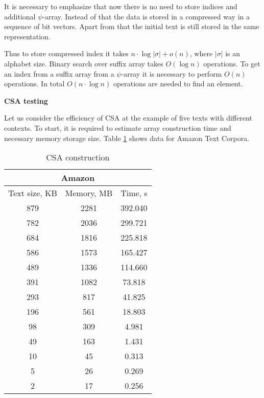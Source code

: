 It is necessary to emphasize that now there is no need to store indices and additional $\psi$-array.
Instead of that the data is stored in a compressed way in a sequence of bit vectors.
Apart from that the initial text is still stored in the same representation.

Thus to store compressed index it takes $n \cdot \log |\sigma| + o(n)$, where
$|\sigma|$ is an alphabet size. Binary search over suffix array takes $O(\log n)$ operations.
To get an index from a suffix array from a $\psi$-array it is necessary to perform $O(n)$ operations.
In total $O(n\cdot \log n)$ operations are needed to find an element.

\textbf{CSA testing}

Let us consider the efficiency of CSA at the example of five texts with different contexts.
To start, it is required to estimate array construction time and necessary memory storage size.
Table \ref{table:6} shows data for Amazon Text Corpora.


\begin{table}[ht!]
	\centering
	\begin{tabular}{|c|c|c|}
		\hline
		\multicolumn{3}{|c|}{Amazon} \\
		\hline
		Text size, KB & Memory, MB & Time, s\\
		\hline
		879 & 2281 & 392.040\\
		\hline
		782 & 2036 & 299.721\\
		\hline
		684 & 1816 & 225.818\\
		\hline
		586 & 1573 & 165.427\\
		\hline
		489 & 1336 & 114.660\\
		\hline
		391 & 1082 & 73.818\\
		\hline
		293 & 817 & 41.825\\
		\hline
		196 & 561 & 18.803\\
		\hline
		98 & 309 & 4.981\\
		\hline
		49 & 163 & 1.431\\
		\hline
		10 & 45 & 0.313\\
		\hline
		5 & 26 & 0.269\\
		\hline
		2 & 17 & 0.256\\
		\hline
	\end{tabular}
	\caption{CSA construction}
	\label{table:6}
\end{table}

